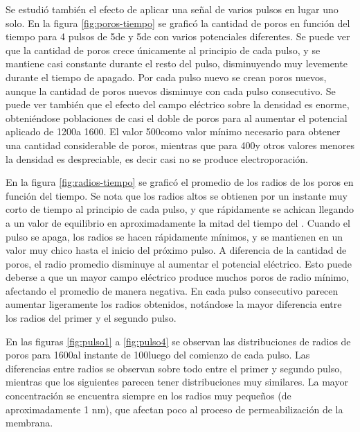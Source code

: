 
Se estudió también el efecto de aplicar una señal de varios pulsos en lugar uno solo. En la figura \ref{fig:poros-tiempo} se graficó la cantidad de poros en función del tiempo para 4 pulsos de 5\ms de \ontime{} y 5\ms de \offtime{} con varios potenciales diferentes. Se puede ver que la cantidad de poros crece únicamente al principio de cada pulso, y se mantiene casi constante durante el resto del pulso, disminuyendo muy levemente durante el tiempo de apagado. Por cada pulso nuevo se crean poros nuevos, aunque la cantidad de poros nuevos disminuye con cada pulso consecutivo. Se puede ver también que el efecto del campo eléctrico sobre la densidad es enorme, obteniéndose poblaciones de casi el doble de poros para al aumentar el potencial aplicado de 1200\vcm a 1600\vcm. El valor 500\vcm como valor mínimo necesario para obtener una cantidad considerable de poros, mientras que para 400\vcm y otros valores menores la densidad es despreciable, es decir casi no se produce electroporación. 

En la figura \ref{fig:radios-tiempo} se graficó el promedio de los radios de los poros en función del tiempo. Se nota que los radios altos se obtienen por un instante muy corto de tiempo al principio de cada pulso, y que rápidamente se achican llegando a un valor de equilibrio en aproximadamente la mitad del tiempo del \ontime. Cuando el pulso se apaga, los radios se hacen rápidamente mínimos, y se mantienen en un valor muy chico hasta el inicio del próximo pulso. A diferencia de la cantidad de poros, el radio promedio disminuye al aumentar el potencial eléctrico. Esto puede deberse a que un mayor campo eléctrico produce muchos poros de radio mínimo, afectando el promedio de manera negativa. En cada pulso consecutivo parecen aumentar ligeramente los radios obtenidos, notándose la mayor diferencia entre los radios del primer y el segundo pulso. 

En las figuras \ref{fig:pulso1} a \ref{fig:pulso4} se observan las distribuciones de radios de poros para 1600\vcm al instante de 100\usec luego del comienzo de cada pulso. Las diferencias entre radios se observan sobre todo entre el primer y segundo pulso, mientras que los siguientes parecen tener distribuciones muy similares. La mayor concentración se encuentra siempre en los radios muy pequeños (de aproximadamente 1 \si{\nano\metre}), que afectan poco al proceso de permeabilización de la membrana.






